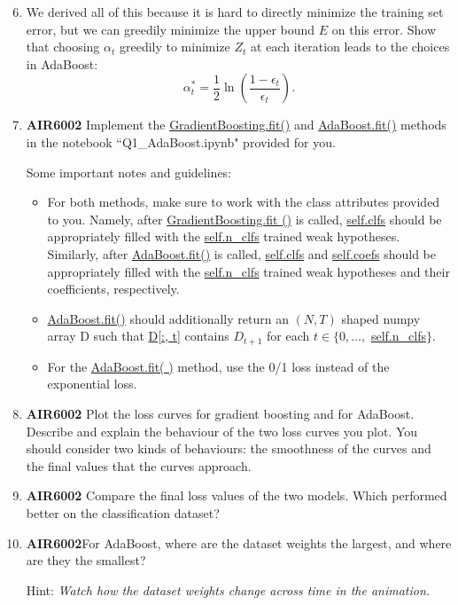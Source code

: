 \documentclass[
	12pt, %
]{fphw}
\begin{document}
\begin{problem}
	\begin{enumerate}
		\setcounter{enumi}{5}
	\item We derived all of this because it is hard to directly minimize the training set error, but we can greedily minimize the upper bound $E$ on this error. Show that choosing $\alpha_t$ greedily to minimize $Z_t$ at each iteration leads to the choices in AdaBoost:  
		$$
		\alpha_t^*=\frac{1}{2} \ln \left(\frac{1-\epsilon_t}{\epsilon_t}\right).
		$$
		\item  \textbf{AIR6002} Implement the \url{GradientBoosting.fit()} and \url{AdaBoost.fit()} methods in the notebook ``Q1\_AdaBoost.ipynb" provided for you. 

Some important notes and guidelines:


		\begin{itemize}
		\item For both methods, make sure to work with the class attributes provided to you. Namely, after \url{GradientBoosting.fit ()} is called, \url{self.clfs} should be appropriately filled with the \url{self.n_clfs} trained weak hypotheses. Similarly, after \url{AdaBoost.fit()} is called, \url{self.clfs} and \url{self.coefs} should be appropriately filled with the \url{self.n_clfs} trained weak hypotheses and their coefficients, respectively.
		\item \url{AdaBoost.fit()} should additionally return an $(N, T)$ shaped numpy array D such that \url{D[:, t]} contains $D_{t+1}$ for each $t \in\{0, \ldots,$ \url{self.n_clfs}$\}$.

		\item For the \url{AdaBoost.fit( )} method, use the 0/1 loss instead of the exponential loss.
		\end{itemize} 



\item \textbf{AIR6002}
Plot the loss curves for gradient boosting and for AdaBoost. 
Describe and explain the behaviour of the two loss curves you plot. You should consider two kinds of behaviours: the smoothness of the curves and the final values that the curves approach. 



\item \textbf{AIR6002} Compare the final loss values of the two models. Which performed better on the classification dataset?



\item \textbf{AIR6002}For AdaBoost, where are the dataset weights the largest, and where are they the smallest? 

Hint: \textit{Watch how the dataset weights change across time in the animation.}

\end{enumerate}
\end{problem}
\end{document}
